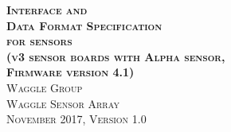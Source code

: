 \documentclass{article}
\begin{document}
\begin{titlepage}
   \begin{center}
        \Huge\textbf{\textsc{Interface and \\ Data Format Specification \\ for sensors \\
        \Large\textsc(v3 sensor boards with Alpha sensor, \\ Firmware version 4.1)}}\\[0.5cm]
        \Large\textsc{Waggle Group \\ Waggle Sensor Array}\\[1cm]
        \large\textsc{November 2017, }
        \large\textsc{Version 1.0}\\
   \end{center}
\end{titlepage}

\tableofcontents
\newpage








\end{document}
